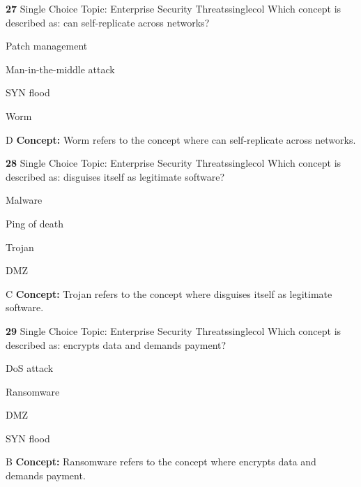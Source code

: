\documentclass[10pt,a4paper]{article}
\begin{document}
\begin{qcard}{\color{white}\textbf{27} \hfill \small Single Choice \textbar{} Topic: Enterprise Security Threats}{singlecol}
Which concept is described as: can self-replicate across networks?

\begin{qoptions}
\item Patch management
\item Man-in-the-middle attack
\item SYN flood
\item Worm
\end{qoptions}
\begin{explainbox}{D}
\textbf{Concept:} Worm refers to the concept where can self-replicate across networks.
\end{explainbox}
\end{qcard}

\begin{qcard}{\color{white}\textbf{28} \hfill \small Single Choice \textbar{} Topic: Enterprise Security Threats}{singlecol}
Which concept is described as: disguises itself as legitimate software?

\begin{qoptions}
\item Malware
\item Ping of death
\item Trojan
\item DMZ
\end{qoptions}
\begin{explainbox}{C}
\textbf{Concept:} Trojan refers to the concept where disguises itself as legitimate software.
\end{explainbox}
\end{qcard}

\begin{qcard}{\color{white}\textbf{29} \hfill \small Single Choice \textbar{} Topic: Enterprise Security Threats}{singlecol}
Which concept is described as: encrypts data and demands payment?

\begin{qoptions}
\item DoS attack
\item Ransomware
\item DMZ
\item SYN flood
\end{qoptions}
\begin{explainbox}{B}
\textbf{Concept:} Ransomware refers to the concept where encrypts data and demands payment.
\end{explainbox}
\end{qcard}
\end{document}

